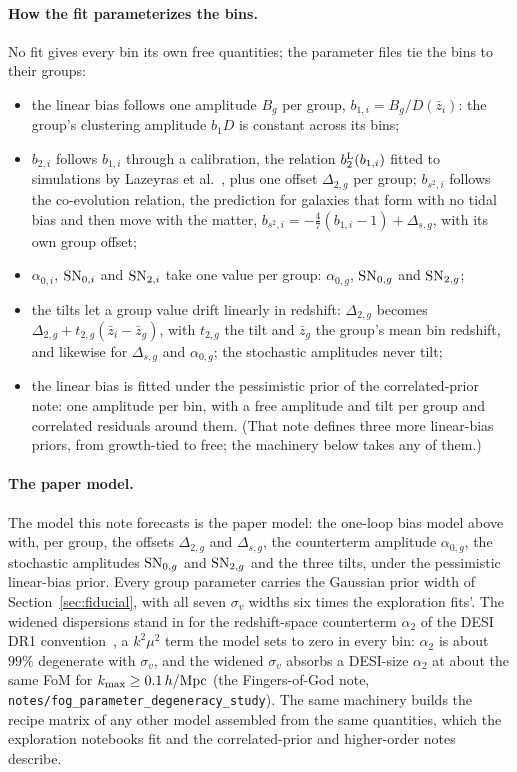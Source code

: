 \documentclass[11pt]{article}
\newcommand{\kmax}{k_{\rm max}}
\newcommand{\hMpc}{\,h/{\rm Mpc}}
\newcommand{\SNzi}{{\rm SN}_{0,i}}
\newcommand{\SNti}{{\rm SN}_{2,i}}
\newcommand{\us}{\_\allowbreak}
\begin{document}
\paragraph{How the fit parameterizes the bins.}
No fit gives every bin its own free quantities; the parameter files
tie the bins to their groups:
\begin{itemize}
  \item the linear bias follows one amplitude $B_g$ per group,
    $b_{1,i} = B_g/D(\bar{z}_i)$: the group's clustering amplitude
    $b_1 D$ is constant across its bins;
  \item $b_{2,i}$ follows $b_{1,i}$ through a calibration, the
    relation $b_2^{\rm L}(b_{1,i})$ fitted to simulations by Lazeyras
    et al.~\cite{Lazeyras2016}, plus one offset $\Delta_{2,g}$ per
    group; $b_{s^2,i}$ follows the co-evolution relation, the
    prediction for galaxies that form with no tidal bias and then move
    with the matter, $b_{s^2,i} = -\tfrac{4}{7}(b_{1,i} - 1) +
    \Delta_{s,g}$, with its own group offset;
  \item $\alpha_{0,i}$, $\SNzi$ and $\SNti$ take one value per group:
    $\alpha_{0,g}$, ${\rm SN}_{0,g}$ and ${\rm SN}_{2,g}$;
  \item the tilts let a group value drift linearly in redshift:
    $\Delta_{2,g}$ becomes $\Delta_{2,g} +
    t_{2,g}(\bar{z}_i - \bar{z}_g)$, with $t_{2,g}$ the tilt and
    $\bar{z}_g$ the group's mean bin redshift, and likewise for
    $\Delta_{s,g}$ and $\alpha_{0,g}$; the stochastic amplitudes never
    tilt;
  \item the linear bias is fitted under the pessimistic prior of the
    correlated-prior note: one amplitude per bin, with a free
    amplitude and tilt per group and correlated residuals around them.
    (That note defines three more linear-bias priors, from growth-tied
    to free; the machinery below takes any of them.)
\end{itemize}

\paragraph{The paper model.}
The model this note forecasts is the paper model: the one-loop bias
model above with, per group, the offsets $\Delta_{2,g}$ and
$\Delta_{s,g}$, the counterterm amplitude $\alpha_{0,g}$, the
stochastic amplitudes ${\rm SN}_{0,g}$ and ${\rm SN}_{2,g}$ and the
three tilts, under the pessimistic linear-bias prior.  Every group
parameter carries the Gaussian prior width of
Section~\ref{sec:fiducial}, with all seven $\sigma_v$ widths six times
the exploration fits'.
The widened dispersions stand in for the redshift-space counterterm
$\alpha_2$ of the DESI DR1 convention~\cite{Maus2024}, a $k^2\mu^2$
term the model sets to zero in every bin: $\alpha_2$ is about $99\%$
degenerate with $\sigma_v$, and the widened $\sigma_v$ absorbs a
DESI-size $\alpha_2$ at about the same FoM for
$\kmax \geq 0.1\hMpc$ (the Fingers-of-God note,
\texttt{notes/fog\us parameter\us degeneracy\us study}).  The same
machinery builds the recipe matrix of any other model assembled from
the same quantities, which the exploration notebooks fit and the
correlated-prior and higher-order notes describe.
\end{document}

